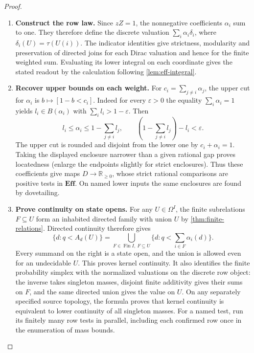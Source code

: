 \documentclass[11pt,a4paper]{article}
\theoremstyle{definition}
\theoremstyle{remark}\newaliascnt{remark}{theorem}
\newcommand{\E}{\mathbf{Eff}}
\newcommand{\R}{\mathbb R}
\newcommand{\Fin}{\operatorname{Fin}}
\numberwithin{equation}{section}
\begin{document}
\begin{proof}\leavevmode
\begin{enumerate}[titledsteps]
    \item \textbf{Construct the row law.} Since $zZ=1$, the nonnegative coefficients $\alpha_i$ sum to one. They therefore define the discrete valuation $\sum_i\alpha_i\delta_i$, where $\delta_i(U)=\tau(U(i))$. The indicator identities give strictness, modularity and preservation of directed joins for each Dirac valuation and hence for the finite weighted sum. Evaluating its lower integral on each coordinate gives the stated readout by the calculation following \cref{lem:eff-integral}.


    \item \textbf{Recover upper bounds on each weight.} For $c_i=\sum_{j\ne i}\alpha_j$, the upper cut for $\alpha_i$ is $b\mapsto[1-b<c_i]$. Indeed for every $\varepsilon>0$ the equality $\sum_i\alpha_i=1$ yields $l_i\in B(\alpha_i)$ with $\sum_i l_i>1-\varepsilon$. Then
\[
  l_i\le\alpha_i\le 1-\sum_{j\ne i}l_j,
  \qquad (1-\sum_{j\ne i}l_j)-l_i<\varepsilon .
\]
The upper cut is rounded and disjoint from the lower one by $c_i+\alpha_i=1$. Taking the displayed enclosure narrower than a given rational gap proves locatedness (enlarge the endpoints slightly for strict enclosures). Thus these coefficients give maps $D\to\R_{\ge0}$, whose strict rational comparisons are positive tests in $\E$. On named lower inputs the same enclosures are found by dovetailing.


    \item \textbf{Prove continuity on state opens.} For any $U\in\Omega^I$, the finite subrelations $F\subseteq U$ form an inhabited directed family with union $U$ by \cref{thm:finite-relations}. Directed continuity therefore gives
\[
 \{d:q<A_d(U)\}=
 \bigcup_{F\in\Fin I,\ F\subseteq U}
       \{d:q<\textstyle\sum_{i\in F}\alpha_i(d)\}.
\]
Every summand on the right is a state open, and the union is allowed even for an undecidable $U$. This proves kernel continuity. It also identifies the finite probability simplex with the normalized valuations on the discrete row object: the inverse takes singleton masses, disjoint finite additivity gives their sums on $F$, and the same directed union gives the value on $U$. On any separately specified source topology, the formula proves that kernel continuity is equivalent to lower continuity of all singleton masses. For a named test, run its finitely many row tests in parallel, including each confirmed row once in the enumeration of mass bounds.\qedhere
\end{enumerate}
\end{proof}
\end{document}
